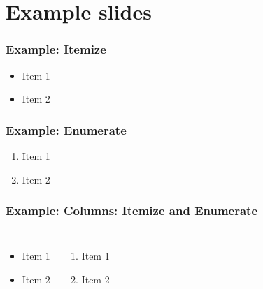\section{Example slides}

    \begin{frame}
        \frametitle{}

    \end{frame}


    \begin{frame}
        \frametitle{Example: Itemize}

        \begin{itemize}
            \item Item 1
            \item Item 2
        \end{itemize}

    \end{frame}


    \begin{frame}
        \frametitle{Example: Enumerate}

        \begin{enumerate}
            \item Item 1
            \item Item 2
        \end{enumerate}

    \end{frame}


    \begin{frame}
        \frametitle{Example: Columns: Itemize and Enumerate}

        \begin{columns}

                \begin{itemize}
                    \item Item 1
                    \item Item 2
                \end{itemize}


                \begin{enumerate}
                    \item Item 1
                    \item Item 2
                \end{enumerate}

        \end{columns}

    \end{frame}


